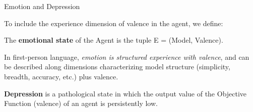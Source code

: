  
 
 


\begin{frame}[label=ladila]{Emotion and Depression \cite{ruffini_algorithmic_2024}}
 
   To include the experience dimension of valence in the agent, we define: 
\begin{definition} 
The {\bf emotional state} of the Agent is the tuple E = (Model, Valence). 
\end{definition}
In first-person language, {\em emotion is structured experience with valence}, and can be described along dimensions characterizing model structure (simplicity, breadth, accuracy, etc.) plus valence.  
  \begin{definition} 
{\bf Depression} is a pathological state in which the output value of the Objective Function (valence) of an agent is persistently low.
\end{definition}
    
 
\end{frame}



